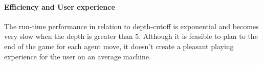 \documentclass[12pt]{article}
\begin{document}
\paragraph{Efficiency and User experience} The run-time performance in relation to depth-cutoff is exponential and becomes very slow when the depth is greater than 5. Although it is feasible to plan to the end of the game for each agent move, it doesn't create a pleasant playing experience for the user on an average machine.
\end{document}
